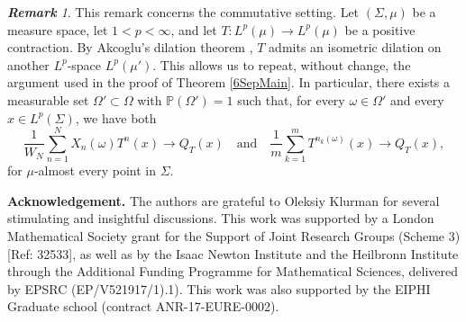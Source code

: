 \documentclass[12pt]{amsart}
\newcommand{\Pdb}{\mbox{$\mathbb{P}$}}
\theoremstyle{remark}
\newtheorem{remark}[theorem]{\bf Remark}
\theoremstyle{definition}
\numberwithin{equation}{section}
\begin{document}
\begin{remark}\label{6Ack}
This remark concerns the commutative setting. Let $(\Sigma,\mu)$ be a measure space, let $1<p<\infty$, and let $T\colon L^p(\mu)\to L^p(\mu)$ be a positive contraction. By Akcoglu’s dilation theorem \cite{AS}, $T$ admits an isometric dilation on another $L^p$-space $L^p(\mu')$. This allows us to repeat, without change, the argument used in the proof of Theorem \ref{6SepMain}. In particular, there exists a measurable set $\Omega' \subset \Omega$ with $\Pdb(\Omega') = 1$ such that, for every $\omega \in \Omega'$ and every $x \in L^p(\Sigma)$, we have both
\[
\frac{1}{W_N}\sum_{n=1}^N X_n(\omega) T^n(x) \longrightarrow Q_T(x) 
\quad \text{and} \quad
\frac{1}{m}\sum_{k=1}^m T^{n_k(\omega)}(x) \longrightarrow Q_T(x),
\]
for $\mu$-almost every point in $\Sigma$.
\end{remark}



\bigskip\noindent
{\bf Acknowledgement.} The authors are grateful to Oleksiy Klurman for several stimulating and insightful discussions. This work was supported by a London Mathematical Society grant for the Support of Joint Research Groups (Scheme 3) [Ref: 32533], as well as by the Isaac Newton Institute and the Heilbronn Institute through the Additional Funding Programme for Mathematical Sciences, delivered by EPSRC (EP/V521917/1).1). 
This work was also supported by the EIPHI Graduate school (contract ANR-17-EURE-0002).

\vskip 1cm
\end{document}
